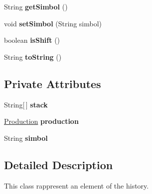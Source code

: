 \begin{DoxyCompactItemize}
\item 
\hypertarget{classparser_program_1_1_history_element_ab64610fe65f58bca7d542244378ac030}{String {\bfseries get\-Simbol} ()}\label{classparser_program_1_1_history_element_ab64610fe65f58bca7d542244378ac030}

\item 
\hypertarget{classparser_program_1_1_history_element_a54ecd254d7abd49d0d10230892dfc35b}{void {\bfseries set\-Simbol} (String simbol)}\label{classparser_program_1_1_history_element_a54ecd254d7abd49d0d10230892dfc35b}

\item 
\hypertarget{classparser_program_1_1_history_element_a233c9c55643f4d6bc8103c4e2c8bd038}{boolean {\bfseries is\-Shift} ()}\label{classparser_program_1_1_history_element_a233c9c55643f4d6bc8103c4e2c8bd038}

\item 
\hypertarget{classparser_program_1_1_history_element_aa0ddd25dd8d27e59d63123b2f50e1cb4}{String {\bfseries to\-String} ()}\label{classparser_program_1_1_history_element_aa0ddd25dd8d27e59d63123b2f50e1cb4}

\end{DoxyCompactItemize}
\subsection*{Private Attributes}
\begin{DoxyCompactItemize}
\item 
\hypertarget{classparser_program_1_1_history_element_a3ab04c9be50cda70dcfd9ee134884d9f}{String\mbox{[}$\,$\mbox{]} {\bfseries stack}}\label{classparser_program_1_1_history_element_a3ab04c9be50cda70dcfd9ee134884d9f}

\item 
\hypertarget{classparser_program_1_1_history_element_a93323e030ba302f08564c7d6cd021a15}{\hyperlink{classcontext_free_1_1grammar_1_1_production}{Production} {\bfseries production}}\label{classparser_program_1_1_history_element_a93323e030ba302f08564c7d6cd021a15}

\item 
\hypertarget{classparser_program_1_1_history_element_a3c9ad24a6a0f33ac5d1cbc95ff1e82de}{String {\bfseries simbol}}\label{classparser_program_1_1_history_element_a3c9ad24a6a0f33ac5d1cbc95ff1e82de}

\end{DoxyCompactItemize}


\subsection{Detailed Description}
This class rappresent an element of the history. 

